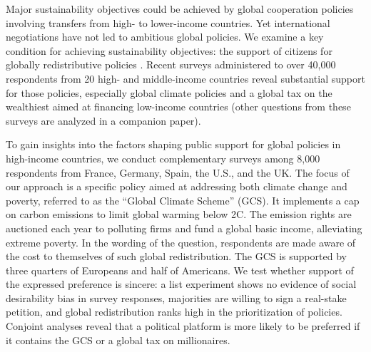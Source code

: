 Major sustainability objectives could be achieved by global cooperation policies involving transfers from high- to lower-income countries.\cite{budolfson_climate_2021,franks_mobilizing_2018,dennig_inequality_2015,soergel_combining_2021,bauer_quantification_2020,cramton_global_2017,fehr_your_2022} 
Yet international negotiations have not led %
to ambitious global policies. %
We examine a key condition for achieving sustainability objectives: the support of citizens for globally redistributive policies%
. 
Recent surveys administered 
to over 40,000 respondents from 20 high- and middle-income countries reveal substantial support for those policies, especially global climate policies and a global tax on the wealthiest aimed at financing low-income countries %
(other questions from these surveys are analyzed in a companion paper\cite{dechezlepretre_fighting_2022}). 

To gain insights into the factors shaping public support for global policies in high-income countries, we conduct complementary surveys among 8,000 respondents from France, Germany, Spain, the U.S., and the UK. The focus of our approach is a specific policy aimed at addressing both climate change and poverty, referred to as the ``Global Climate Scheme'' (GCS). It implements a cap on carbon emissions to limit global warming below 2\textdegree{}C. The emission rights are auctioned each year to polluting firms and fund a global basic income, alleviating extreme poverty. 
In the wording of the question, respondents are made aware of the cost to themselves of such global redistribution. 
The GCS is supported by three quarters of Europeans and half of Americans. We test whether support of the expressed preference is sincere: a list experiment shows no evidence of social desirability bias in survey responses, majorities are willing to sign a real-stake petition, and global redistribution ranks high in the prioritization of policies. Conjoint analyses reveal that a political platform is more likely to be preferred if it contains the GCS or a global tax on millionaires. 

